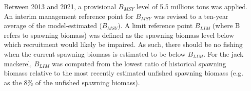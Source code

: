 \documentclass{article}
\begin{document}
Between 2013 and 2021, a provisional \(B_{MSY}\) level of 5.5 millions tons was applied. 
An interim management reference point for \(B_{MSY}\) was revised to a ten-year average of the model-estimated (\(B_{MSY}\)). 
A limit reference point \(B_{LIM}\) (where B refers to spawning biomass) was defined as the spawning biomass level below which recruitment would likely be impaired. As such, there should be no fishing when the current spawning biomass is estimated to be below \(B_{LIM}\).
For the jack mackerel, \(B_{LIM}\) was computed from the lowest ratio of historical spawning biomass relative to the most recently estimated unfished spawning biomass (e.g. as the 8\% of the unfished spawning biomass).\\

\end{document}
